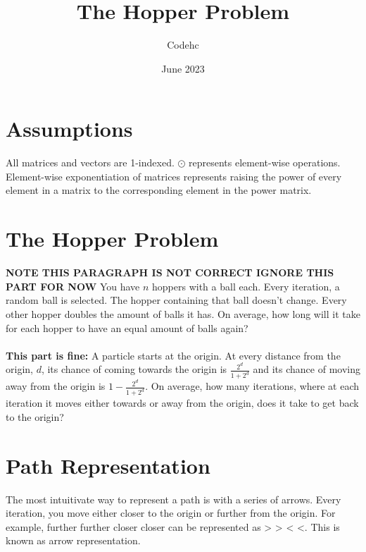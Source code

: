 \documentclass[letterpaper, 12pt]{report}
\title{The Hopper Problem}
\author{Codehc}
\date{June 2023}
\begin{document}
\maketitle

\section{Assumptions}
All matrices and vectors are 1-indexed. $\odot$ represents element-wise operations. Element-wise exponentiation of matrices represents raising the power of every element in a matrix to the corresponding element in the power matrix.

\section{The Hopper Problem}

\textbf{NOTE THIS PARAGRAPH IS NOT CORRECT IGNORE THIS PART FOR NOW} You have $n$ hoppers with a ball each. Every iteration, a random ball is selected. The hopper containing that ball doesn't change. Every other hopper doubles the amount of balls it has. On average, how long will it take for each hopper to have an equal amount of balls again?
\\
\\
\textbf{This part is fine:} A particle starts at the origin. At every distance from the origin, $d$, its chance of coming towards the origin is $\frac{2^d}{1+2^d}$ and its chance of moving away from the origin is $1-\frac{2^d}{1+2^d}$. On average, how many iterations, where at each iteration it moves either towards or away from the origin, does it take to get back to the origin?

\section{Path Representation}

The most intuitivate way to represent a path is with a series of arrows. Every iteration, you move either closer to the origin or further from the origin. For example, further further closer closer can be represented as > > < <. This is known as arrow representation.
\end{document}
